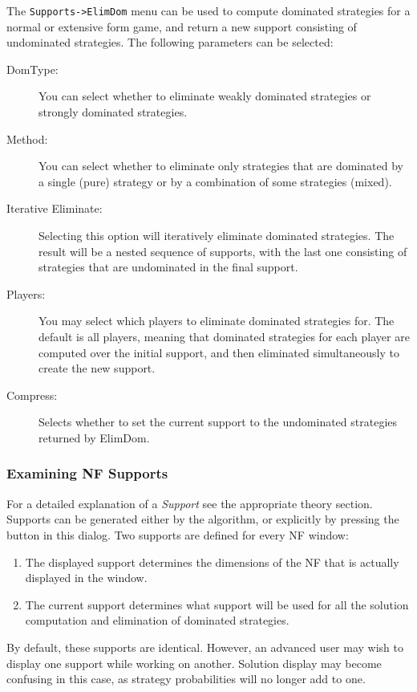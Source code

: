 The {\tt Supports->ElimDom} menu can be used to compute dominated 
strategies for a normal or extensive form game, and return a new support 
consisting of undominated strategies.  
The following parameters can 
be selected:
\begin{description}
\item[DomType:]  You can select whether to eliminate weakly dominated 
strategies or strongly dominated strategies.
\item[Method:] You can select whether to eliminate only strategies that are
dominated by a single (pure) strategy or by a combination of some strategies
(mixed).
\item[Iterative Eliminate:] Selecting this option will iteratively eliminate dominated strategies. The 
result will be a nested sequence of supports, with the last one consisting of 
strategies that are undominated in the final support.  
\item[Players:] You may select which players to eliminate dominated strategies for. The 
default is all players, meaning that dominated strategies for each player are computed 
over the initial support, and then eliminated simultaneously to create the new support.  
\item[Compress:] Selects whether to set the current support to the undominated 
strategies returned by ElimDom.  
\end{description}

\subsubsection{Examining NF Supports}\label{ElimDomInspect}
For a detailed explanation of a {\em Support} see the appropriate theory section.
Supports can be generated either by the 
  algorithm, 
or explicitly by pressing the  button 
in this dialog.  Two supports are defined for every NF window:
\begin{enumerate}
\item The displayed support determines the dimensions of the NF that is actually
displayed in the window.
\item The current support determines what support will be used for all the solution
computation and elimination of dominated strategies. 
\end{enumerate}
By default, these supports are identical.  However, an advanced user may wish to
display one support while working on another.  Solution display may become 
confusing in this case, as strategy probabilities will no longer add to one.  

